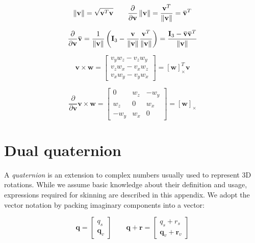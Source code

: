 \documentclass[a4paper,10pt]{article}
\newcommand{\overbar}[1]{\mkern 1.5mu\overline{\mkern-1.5mu#1\mkern-1.5mu}\mkern 1.5mu}
\begin{document}
\begin{multicols}{2}
\begin{equation*}
\left\| \mathbf{v} \right\| = \sqrt{\mathbf{v}^T\mathbf{v}} \qquad
\frac{\partial}{\partial \mathbf{v}} \left\| \mathbf{v} \right\| = \frac{\mathbf{v}^T}{\left\| \mathbf{v} \right\|} = \overbar{\mathbf{v}}^T
\end{equation*}

\begin{equation*}
\frac{\partial}{\partial \mathbf{v}} \overbar{\mathbf{v}} = 
\frac{1}{\left\| \mathbf{v} \right\|}\left( \mathbf{I}_3 - \frac{\mathbf{v}}{\left\| \mathbf{v} \right\|} \frac{\mathbf{v}^T}{\left\| \mathbf{v} \right\|} \right) =
\frac{\mathbf{I}_3 - \overbar{\mathbf{v}}\overbar{\mathbf{v}}^T}{\left\| \mathbf{v} \right\|}
\end{equation*}

\begin{equation*}
\mathbf{v} \times \mathbf{w} =
\begin{bmatrix}v_y w_z - v_z w_y \\ v_z w_x - v_x w_z \\ v_x w_y - v_y w_x \end{bmatrix} =
\left[\mathbf{w}\right]_\times^T \mathbf{v}
\end{equation*}

\begin{equation*}
\frac{\partial}{\partial \mathbf{v}} \mathbf{v} \times \mathbf{w} =
\begin{bmatrix} 0 & w_z & -w_y \\ w_z & 0 & w_x \\ -w_y & w_x & 0 \end{bmatrix} =
\left[\mathbf{w}\right]_\times
\end{equation*}


\section{Dual quaternion}
\label{section:quaternion}

A \emph{quaternion} is an extension to complex numbers usually used to represent 3D rotations.
While we assume basic knowledge about their definition and usage, expressions required for skinning are described in this appendix.
We adopt the vector notation by packing imaginary components into a vector:

\begin{equation*}
\mathbf{q} = \begin{bmatrix}q_s \\ \mathbf{q}_v \end{bmatrix}
\qquad
\mathbf{q} + \mathbf{r} = \begin{bmatrix}q_s + r_s \\ \mathbf{q}_v + \mathbf{r}_v \end{bmatrix}
\end{equation*}


\end{multicols}
\end{document}
